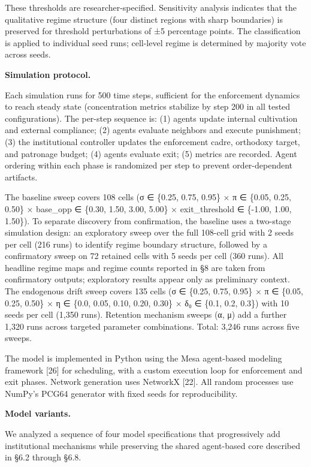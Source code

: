 \documentclass[12pt]{article}
\begin{document}
These thresholds are researcher-specified. Sensitivity analysis indicates that the qualitative regime structure (four distinct regions with sharp boundaries) is preserved for threshold perturbations of ±5 percentage points. The classification is applied to individual seed runs; cell-level regime is determined by majority vote across seeds.

%

\textbf{Simulation protocol.}

Each simulation runs for 500 time steps, sufficient for the enforcement dynamics to reach steady state (concentration metrics stabilize by step 200 in all tested configurations). The per-step sequence is: (1) agents update internal cultivation and external compliance; (2) agents evaluate neighbors and execute punishment; (3) the institutional controller updates the enforcement cadre, orthodoxy target, and patronage budget; (4) agents evaluate exit; (5) metrics are recorded. Agent ordering within each phase is randomized per step to prevent order-dependent artifacts.

The baseline sweep covers 108 cells (σ ∈ \{0.25, 0.75, 0.95\} × π ∈ \{0.05, 0.25, 0.50\} × base\_opp ∈ \{0.30, 1.50, 3.00, 5.00\} × exit\_threshold ∈ \{-1.00, 1.00, 1.50\}). To separate discovery from confirmation, the baseline uses a two-stage simulation design: an exploratory sweep over the full 108-cell grid with 2 seeds per cell (216 runs) to identify regime boundary structure, followed by a confirmatory sweep on 72 retained cells with 5 seeds per cell (360 runs). All headline regime maps and regime counts reported in §8 are taken from confirmatory outputs; exploratory results appear only as preliminary context. The endogenous drift sweep covers 135 cells (σ ∈ \{0.25, 0.75, 0.95\} × π ∈ \{0.05, 0.25, 0.50\} × η ∈ \{0.0, 0.05, 0.10, 0.20, 0.30\} × δ₀ ∈ \{0.1, 0.2, 0.3\}) with 10 seeds per cell (1,350 runs). Retention mechanism sweeps (α, μ) add a further 1,320 runs across targeted parameter combinations. Total: 3,246 runs across five sweeps.

The model is implemented in Python using the Mesa agent-based modeling framework [26] for scheduling, with a custom execution loop for enforcement and exit phases. Network generation uses NetworkX [22]. All random processes use NumPy's PCG64 generator with fixed seeds for reproducibility.

%

\textbf{Model variants.}

We analyzed a sequence of four model specifications that progressively add institutional mechanisms while preserving the shared agent-based core described in §6.2 through §6.8.
\end{document}
